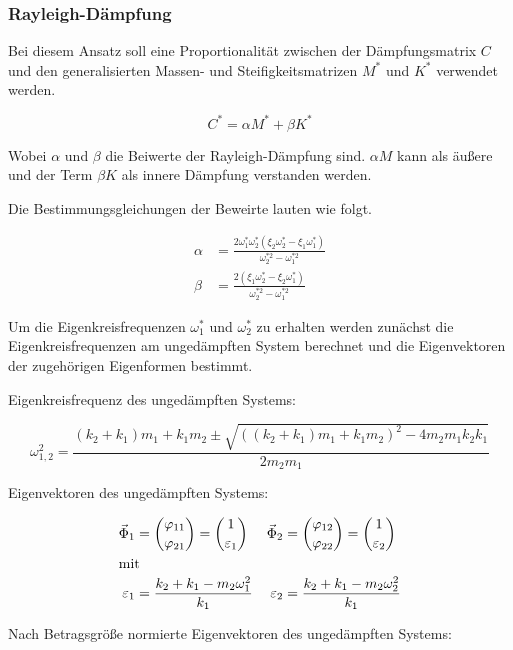 \subsubsection{Rayleigh-Dämpfung}
\label{sec:rayleigh}

Bei diesem Ansatz soll eine Proportionalität zwischen der Dämpfungsmatrix $C$ und den generalisierten Massen- und Steifigkeitsmatrizen $M^*$ und $K^*$ verwendet werden.

\begin{equation*}
C^* = \alpha M^* + \beta K^*
\end{equation*}

Wobei $\alpha$ und $\beta$ die Beiwerte der Rayleigh-Dämpfung sind.
$\alpha M$ kann als äußere und der Term $\beta K$ als innere Dämpfung verstanden werden.

Die Bestimmungsgleichungen der Beweirte lauten wie folgt.

\begin{align*}
\alpha &= \frac{2 \omega_1^* \omega_2^* (\xi_2 \omega_2^* - \xi_1 \omega_1^*)}{\omega_2^{*2} - \omega_1^{*2}}\\
\beta  &= \frac{2 (\xi_1 \omega_2^* - \xi_2 \omega_1^*)}{\omega_2^{*2} - \omega_1^{*2}}
\end{align*}

Um die Eigenkreisfrequenzen $\omega_1^*$ und $\omega_2^*$ zu erhalten werden zunächst die Eigenkreisfrequenzen am ungedämpften System berechnet und die Eigenvektoren der zugehörigen Eigenformen bestimmt.

Eigenkreisfrequenz des ungedämpften Systems:

\begin{equation*}
\omega_{1,2}^2 = \frac{(k_2 + k_1) m_1 + k_1 m_2 \pm \sqrt{((k_2 + k_1) m_1 + k_1 m_2)^2 - 4 m_2 m_1 k_2 k_1}}{2 m_2 m_1}
\end{equation*}

Eigenvektoren des ungedämpften Systems:

\begin{align*}
\vec{\Phi}_1 &= \binom{\varphi_{11}}{\varphi_{21}} = \binom{1}{\varepsilon_1} & \vec{\Phi}_2 &= \binom{\varphi_{12}}{\varphi_{22}} = \binom{1}{\varepsilon_2}\\
\intertext{mit}
\varepsilon_1 &= \frac{k_2 + k_1 - m_2 \omega_1^2}{k_1} & \varepsilon_2 &= \frac{k_2 + k_1 - m_2 \omega_2^2}{k_1}
\end{align*}

Nach Betragsgröße normierte Eigenvektoren des ungedämpften Systems:

